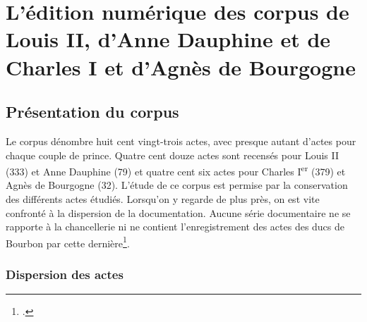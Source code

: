 \part{L'édition numérique des corpus de Louis II, d'Anne Dauphine et de Charles I et d'Agnès de Bourgogne}


\newpage

	\chapter{Présentation du corpus}

\par Le corpus dénombre huit cent vingt-trois actes, avec presque autant d'actes pour chaque couple de prince. Quatre cent douze actes sont recensés pour Louis II (333) et Anne Dauphine (79) et quatre cent six actes pour Charles I\textsuperscript{er} (379) et Agnès de Bourgogne (32). L'étude de ce corpus est permise par la conservation des différents actes étudiés. Lorsqu'on y regarde de plus près, on est vite confronté  à la dispersion de la documentation. Aucune série documentaire ne se rapporte à la chancellerie ni ne contient l'enregistrement des actes des ducs de Bourbon par cette dernière\footnote{\cite{matteoniEcriturePouvoirPrincier2011}.}.
\newpage 

\section{Dispersion des actes}
\label{I.1.1}

